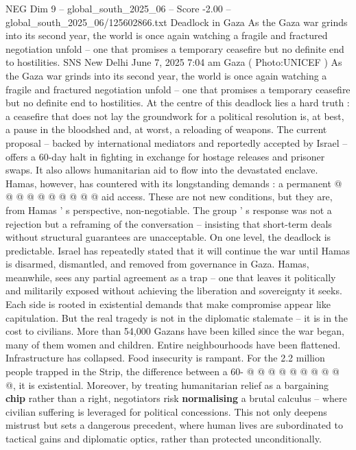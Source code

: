 \begin{textsample}{NEG Dim 9 – global\_south\_2025\_06 – Score -2.00 – global\_south\_2025\_06/125602866.txt}  \label{ex:f9_neg_282}
Deadlock in Gaza As the Gaza war grinds into its second year, the world is once again watching a fragile and fractured negotiation unfold -- one that promises a temporary ceasefire but no definite end to hostilities.
SNS New Delhi June 7, 2025 7:04 am Gaza ( Photo:UNICEF ) As the Gaza war grinds into its second year, the world is once again watching a fragile and fractured negotiation unfold -- one that promises a temporary ceasefire but no definite end to hostilities.
At the centre of this deadlock lies a hard truth : a ceasefire that does not lay the groundwork for a political resolution is, at best, a pause in the bloodshed and, at worst, a reloading of weapons.
The current proposal -- backed by international mediators and reportedly accepted by Israel -- offers a 60-day halt in fighting in exchange for hostage releases and prisoner swaps.
It also allows humanitarian aid to flow into the devastated enclave.
Hamas, however, has countered with its longstanding demands : a permanent @ @ @ @ @ @ @ @ @ @ aid access.
These are not new conditions, but they are, from Hamas ' s perspective, non-negotiable.
The group ' s response was not a rejection but a reframing of the conversation -- insisting that short-term deals without structural guarantees are unacceptable.
On one level, the deadlock is predictable.
Israel has repeatedly stated that it will continue the war until Hamas is disarmed, dismantled, and removed from governance in Gaza.
Hamas, meanwhile, sees any partial agreement as a trap -- one that leaves it politically and militarily exposed without achieving the liberation and sovereignty it seeks.
Each side is rooted in existential demands that make compromise appear like capitulation.
But the real tragedy is not in the diplomatic stalemate -- it is in the cost to civilians.
More than 54,000 Gazans have been killed since the war began, many of them women and children.
Entire neighbourhoods have been flattened.
Infrastructure has collapsed.
Food insecurity is rampant.
For the 2.2 million people trapped in the Strip, the difference between a 60- @ @ @ @ @ @ @ @ @ @, it is existential.
Moreover, by treating humanitarian relief as a bargaining \textbf{chip} rather than a right, negotiators risk \textbf{normalising} a brutal calculus -- where civilian suffering is leveraged for political concessions.
This not only deepens mistrust but sets a dangerous precedent, where human lives are subordinated to tactical gains and diplomatic optics, rather than protected unconditionally.

\end{textsample}
